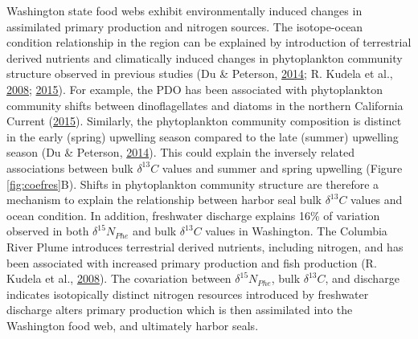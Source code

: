 \documentclass [11pt, proquest] {uwthesis}[2015/03/03]
\begin{document}
Washington state food webs exhibit environmentally induced changes in
assimilated primary production and nitrogen sources. The isotope-ocean
condition relationship in the region can be explained by introduction of
terrestrial derived nutrients and climatically induced changes in
phytoplankton community structure observed in previous studies (Du \&
Peterson, \protect\hyperlink{ref-Du2014}{2014}; R. Kudela et al.,
\protect\hyperlink{ref-Kudela2008}{2008};
\protect\hyperlink{ref-Du2015}{2015}). For example, the PDO has been
associated with phytoplankton community shifts between dinoflagellates
and diatoms in the northern California Current
(\protect\hyperlink{ref-Du2015}{2015}). Similarly, the phytoplankton
community composition is distinct in the early (spring) upwelling season
compared to the late (summer) upwelling season (Du \& Peterson,
\protect\hyperlink{ref-Du2014}{2014}). This could explain the inversely
related associations between bulk \(\delta^{13}C\) values and summer and
spring upwelling (Figure \ref{fig:coefres}B). Shifts in phytoplankton
community structure are therefore a mechanism to explain the
relationship between harbor seal bulk \(\delta^{13}C\) values and ocean
condition. In addition, freshwater discharge explains 16\% of variation
observed in both \(\delta^{15}N_{Phe}\) and bulk \(\delta^{13}C\) values
in Washington. The Columbia River Plume introduces terrestrial derived
nutrients, including nitrogen, and has been associated with increased
primary production and fish production (R. Kudela et al.,
\protect\hyperlink{ref-Kudela2008}{2008}). The covariation between
\(\delta^{15}N_{Phe}\), bulk \(\delta^{13}C\), and discharge indicates
isotopically distinct nitrogen resources introduced by freshwater
discharge alters primary production which is then assimilated into the
Washington food web, and ultimately harbor seals.
\end{document}
